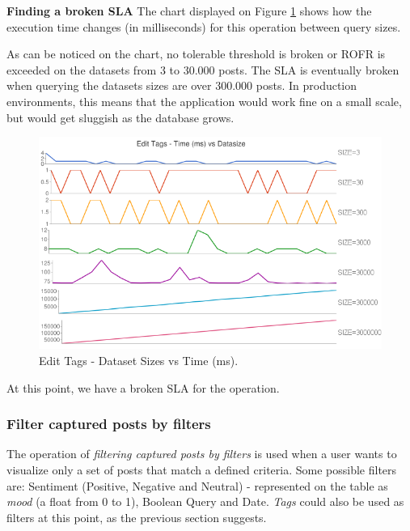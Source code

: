\textbf{Finding a broken SLA}
\hfill \break
The chart displayed on Figure \ref{fig:tags-scenairo-02-chart} shows how the execution time changes (in milliseconds) for this operation between query sizes. 

As can be noticed on the chart, no tolerable threshold is broken or ROFR is exceeded on the datasets from 3 to 30.000 posts. The SLA is eventually broken when querying the datasets sizes are over 300.000 posts. In production environments, this means that the application would work fine on a small scale, but would get sluggish as the database grows.

\begin{figure}[ht!]
\centering
\includegraphics[width=150mm]{Imagens/second-scenario.png}
\caption{Edit Tags - Dataset Sizes vs Time (ms).\label{fig:tags-scenairo-02-chart}}
\end{figure}

At this point, we have a broken SLA for the operation. 






\clearpage









\subsubsection{Filter captured posts by filters}

The operation of \textit{filtering captured posts by filters} is used when a user wants to visualize only a set of posts that match a defined criteria. Some possible filters are: Sentiment (Positive, Negative and Neutral) - represented on the table as \textit{mood} (a float from 0 to 1), Boolean Query and Date. \textit{Tags} could also be used as filters at this point, as the previous section suggests. 


